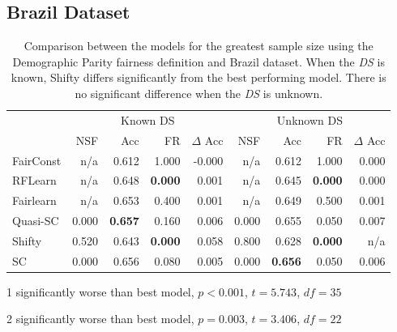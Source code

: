 \subsection{Brazil Dataset}
\begin{table}[H]
\begin{threeparttable}
\centering
\begin{tabular}{lrrrrrrrr}
\toprule
 & \multicolumn{4}{c}{Known DS} & \multicolumn{4}{c}{Unknown DS} \\
 & NSF & Acc & FR & $\Delta$ Acc & NSF & Acc & FR & $\Delta$ Acc \\
\cmidrule(r){2-5} \cmidrule{6-9}
FairConst & n/a & 0.612 & 1.000 & -0.000 & n/a & 0.612 & 1.000 & 0.000 \\
RFLearn & n/a & 0.648 & \bfseries 0.000 & 0.001 & n/a & 0.645 & \bfseries 0.000 & 0.000 \\
Fairlearn & n/a & 0.653 & 0.400 & 0.001 & n/a & 0.649 & 0.500 & 0.001 \\
Quasi-SC & 0.000 & \bfseries 0.657 & 0.160 & 0.006 & 0.000 & 0.655 & 0.050 & 0.007 \\
Shifty & 0.520 & 0.643\tnote{1} & \bfseries 0.000 & 0.058 & 0.800 & 0.628\tnote{2} & \bfseries 0.000 & n/a \\
SC & 0.000 & 0.656 & 0.080 & 0.005 & 0.000 & \bfseries 0.656 & 0.050 & 0.006 \\
\bottomrule
\end{tabular}
\begin{tablenotes}
\item[1] significantly worse than best model, $p<0.001$, $t=5.743$, $df=35$
\item[2] significantly worse than best model, $p=0.003$, $t=3.406$, $df=22$
\end{tablenotes}
\end{threeparttable}
\caption{Comparison between the models for the greatest sample size using the Demographic Parity fairness definition and Brazil dataset. When the \textit{DS} is known, Shifty differs significantly from the best performing model. There is no significant difference when the \textit{DS} is unknown.}
\label{dp_brazil}
\end{table}
